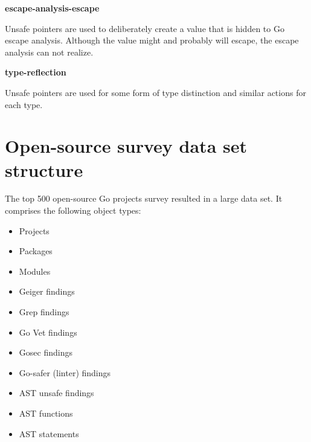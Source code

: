 \textbf{escape-analysis-escape}

Unsafe pointers are used to deliberately create a value that is hidden to Go escape analysis.
Although the value might and probably will escape, the escape analysis can not realize.




\textbf{type-reflection}

Unsafe pointers are used for some form of type distinction and similar actions for each type.
















        \chapter{Open-source survey data set structure}\label{ch:app:data-structure}

        The top 500 open-source Go projects survey resulted in a large data set.
        It comprises the following object types:

        \begin{itemize}
            \item Projects
            \item Packages
            \item Modules
            \item Geiger findings
            \item Grep findings
            \item Go Vet findings
            \item Gosec findings
            \item Go-safer (linter) findings
            \item AST unsafe findings
            \item AST functions
            \item AST statements
        \end{itemize}

